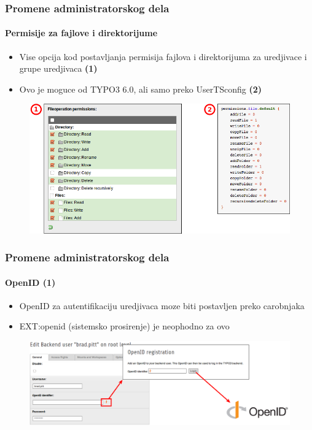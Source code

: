 
\begin{frame}[fragile]
	\frametitle{Promene administratorskog dela}
	\framesubtitle{Permisije za fajlove i direktorijume}

 	\begin{itemize}
		\item Vise opcija kod postavljanja permisija fajlova i direktorijuma za uredjivace i grupe uredjivaca
			\begingroup\color{typo3red}\textbf{(1)}\endgroup
		\item Ovo je moguce od TYPO3 6.0, ali samo preko UserTSconfig
			\begingroup\color{typo3red}\textbf{(2)}\endgroup
	\end{itemize}

	\begin{figure}
		\includegraphics[width=0.75\linewidth]{Images/BackendChanges/FileAndDirectoryPermissions.png}
	\end{figure}

\end{frame}


\begin{frame}[fragile]
	\frametitle{Promene administratorskog dela}
	\framesubtitle{OpenID (1)}

 	\begin{itemize}
		\item OpenID za autentifikaciju uredjivaca moze biti postavljen preko carobnjaka
		\item EXT:openid (sistemsko prosirenje) je neophodno za ovo
	\end{itemize}

	\begin{figure}
		\includegraphics[width=0.95\linewidth]{Images/BackendChanges/OpenIdWizard.png}
	\end{figure}

\end{frame}

